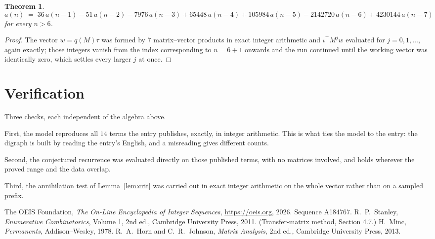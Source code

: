 \documentclass[11pt,a4paper]{article}
\theoremstyle{plain}
\newtheorem{theorem}{Theorem}
\theoremstyle{definition}
\begin{document}
\begin{theorem}
\[
a(n)\;=\;36\,a(n-1) - 51\,a(n-2) - 7976\,a(n-3) + 65448\,a(n-4) + 105984\,a(n-5) - 2142720\,a(n-6) + 4230144\,a(n-7)
\]
for every $n>6$.
\end{theorem}

\begin{proof}
The vector $w=q(M)\tau$ was formed by $7$ matrix--vector products in exact integer
arithmetic and $\iota^{\!\top}M^{j}w$ evaluated for $j=0,1,\dots$, again exactly; those
integers vanish from the index corresponding to $n=6+1$ onwards and the run continued
until the working vector was identically zero, which settles every larger $j$ at once.
\end{proof}

\section{Verification}

Three checks, each independent of the algebra above.

First, the model reproduces all $14$ terms the entry publishes, exactly, in integer
arithmetic. This is what ties the model to the entry: the digraph is built by reading the
entry's English, and a misreading gives different counts.

Second, the conjectured recurrence was evaluated directly on those published terms, with no
matrices involved, and holds wherever the proved range and the data overlap.

Third, the annihilation test of Lemma~\ref{lem:crit} was carried out in exact integer
arithmetic on the whole vector rather than on a sampled prefix.

\begin{thebibliography}{9}
 The OEIS Foundation, \emph{The On-Line Encyclopedia of Integer
Sequences}, \url{https://oeis.org}, 2026. Sequence A184767.
 R.~P.~Stanley, \emph{Enumerative Combinatorics}, Volume 1, 2nd ed.,
Cambridge University Press, 2011. (Transfer-matrix method, Section 4.7.)
 H.~Minc, \emph{Permanents}, Addison--Wesley, 1978.
 R.~A.~Horn and C.~R.~Johnson, \emph{Matrix Analysis}, 2nd ed., Cambridge
University Press, 2013.
\end{thebibliography}
\end{document}
